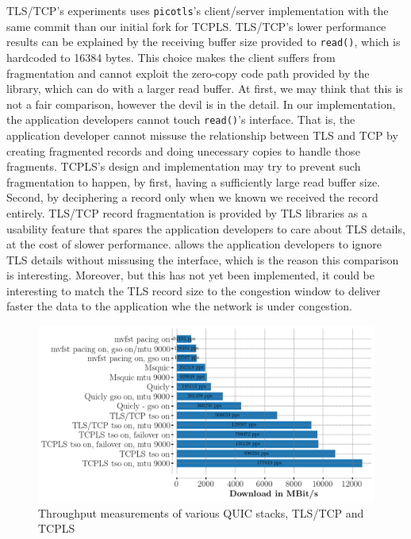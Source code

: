 TLS/TCP's experiments uses \texttt{picotls}'s client/server implementation with
the same commit than our initial fork for TCPLS. TLS/TCP's lower performance results
can be explained by the receiving buffer size provided to \texttt{read()}, which
is hardcoded to 16384 bytes. This choice makes the client suffers from
fragmentation and cannot exploit the zero-copy code path provided by the
library, which \tcpls can do with a larger read buffer. At first, we may think
that this is not a fair comparison, however the devil is in the detail. In our
implementation, the application developers cannot touch \texttt{read()}'s
interface. That is, the application developer cannot missuse the relationship
between TLS and TCP by creating fragmented records and doing unecessary copies
to handle those fragments. TCPLS's design and implementation may try to prevent
such fragmentation to happen, by first, having a sufficiently large read buffer
size. Second, by deciphering a record only when we known we received the record
entirely. TLS/TCP record fragmentation is provided by TLS libraries as a
usability feature that spares the application developers to care about TLS
details, at the cost of slower performance. \tcpls allows the application
developers to ignore TLS details without missusing the interface,
which is the reason this comparison is interesting. Moreover, but this has not
yet been implemented, it could be interesting to match the TLS record size to
the congestion window to deliver faster the data to the application whe the
network is under congestion.


\begin{figure}[!t] \begin{center}
    \includegraphics[width=\columnwidth]{figures/perf_analysis.png} \end{center}
  \caption{Throughput measurements of various QUIC stacks, TLS/TCP and TCPLS}
  \label{fig:perf} \end{figure}

